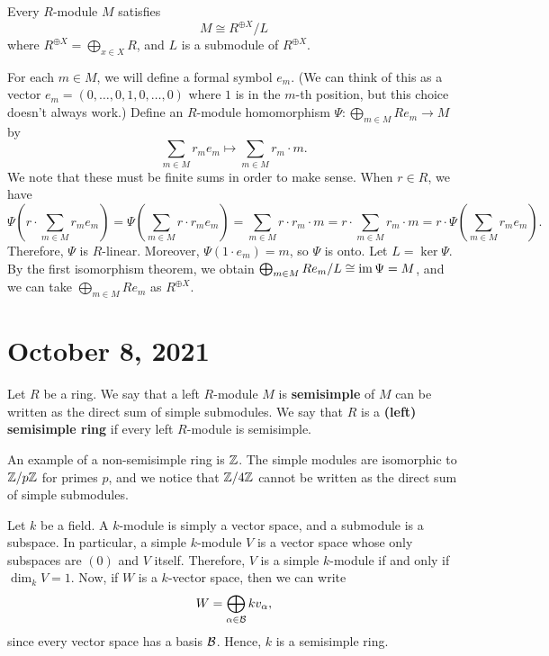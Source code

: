 \begin{prop}
    Every $R$-module $M$ satisfies 
    \[ M \cong R^{\oplus X}/L \] 
    where $R^{\oplus X} = \bigoplus_{x \in X} R$, and $L$ is a submodule of 
    $R^{\oplus X}$. 
\end{prop}
\begin{pf}
    For each $m \in M$, we will define a formal symbol $e_m$. 
    (We can think of this as a vector $e_m = (0, \dots, 0, 1, 0, \dots, 0)$ 
    where $1$ is in the $m$-th position, but this choice doesn't always work.)
    Define an $R$-module homomorphism $\Psi : \bigoplus_{m \in M} Re_m \to M$ by 
    \[ \sum_{m \in M} r_m e_m \mapsto \sum_{m \in M} r_m \cdot m. \] 
    We note that these must be finite sums in order to make sense. When $r \in R$, 
    we have 
    \[ \Psi\left(r \cdot \sum_{m \in M} r_m e_m \right) 
        = \Psi\left( \sum_{m \in M} r \cdot r_m e_m \right) 
        = \sum_{m \in M} r \cdot r_m \cdot m 
        = r \cdot \sum_{m \in M} r_m \cdot m 
        = r \cdot \Psi \left( \sum_{m \in M} r_m e_m \right). \] 
    Therefore, $\Psi$ is $R$-linear. Moreover, $\Psi(1 \cdot e_m) = m$, so 
    $\Psi$ is onto. Let $L = \ker\Psi$. By the first isomorphism theorem, 
    we obtain $\bigoplus_{m \in M} Re_m/L \cong \operatorname{im}\Psi = M$, 
    and we can take  $\bigoplus_{m \in M} Re_m$ as $R^{\oplus X}$. 
\end{pf}

\section{October 8, 2021}

\begin{defn}
    Let $R$ be a ring. We say that a left $R$-module $M$ is {\bf semisimple} 
    of $M$ can be written as the direct sum of simple submodules. We say that 
    $R$ is a {\bf (left) semisimple ring} if every left $R$-module is semisimple.
\end{defn}

\begin{exmp}
    An example of a non-semisimple ring is $\mathbb{Z}$. The simple modules are 
    isomorphic to $\mathbb{Z}/p\mathbb{Z}$ for primes $p$, and we notice that 
    $\mathbb{Z}/4\mathbb{Z}$ cannot be written as the direct sum of simple submodules. 
\end{exmp}

\begin{exmp}
    Let $k$ be a field. A $k$-module is simply a vector space, and a 
    submodule is a subspace. In particular, a simple $k$-module $V$ is a vector 
    space whose only subspaces are $(0)$ and $V$ itself. Therefore, $V$ 
    is a simple $k$-module if and only if $\dim_k V = 1$. Now, if 
    $W$ is a $k$-vector space, then we can write 
    \[ W = \bigoplus_{\alpha \in {\cal B}} kv_\alpha, \] 
    since every vector space has a basis ${\cal B}$. Hence, $k$ is a semisimple ring. 
\end{exmp}

